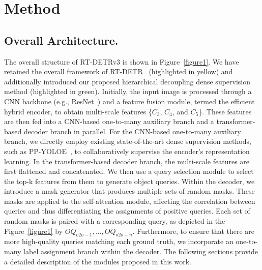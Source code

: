 \documentclass[10pt,twocolumn,letterpaper]{article}
\begin{document}
\section{Method}
\subsection{Overall Architecture.}
The overall structure of RT-DETRv3 is shown in Figure~\ref{figure1}. We have retained the overall framework of RT-DETR~\cite{zhao2024rt-detr} (highlighted in yellow) and additionally introduced our proposed hierarchical decoupling dense supervision method (highlighted in green). Initially, the input image is processed through a CNN backbone (e.g., ResNet~\cite{he2016resnet}) and a feature fusion module, termed the efficient hybrid encoder, to obtain multi-scale features \{$C_{3}$, $C_{4}$, and $C_{5}$\}. These features are then fed into a CNN-based one-to-many auxiliary branch and a transformer-based decoder branch in parallel. For the CNN-based one-to-many auxiliary branch, we directly employ existing state-of-the-art dense supervision methods, such as PP-YOLOE~\cite{xu2022ppyoloe}, to collaboratively supervise the encoder's representation learning. In the transformer-based decoder branch, the multi-scale features are first flattened and concatenated. We then use a query selection module to select the top-k features from them to generate object queries. Within the decoder, we introduce a mask generator that produces multiple sets of random masks. These masks are applied to the self-attention module, affecting the correlation between queries and thus differentiating the assignments of positive queries. Each set of random masks is paired with a corresponding query, as depicted in the Figure~\ref{figure1} by $OQ_{o2o-1},..., OQ_{o2o-n}$. Furthermore, to ensure that there are more high-quality queries matching each ground truth, we incorporate an one-to-many label assignment branch within the decoder. The following sections provide a detailed description of the modules proposed in this work.
\end{document}
